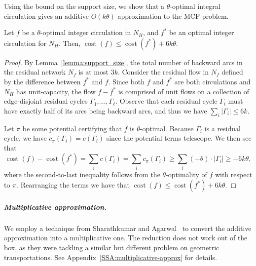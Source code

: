 \documentclass[a4paper,UKenglish]{socg-lipics-v2018}
\def\eps{\varepsilon}
\def\cost{\operatorname{cost}}
\theoremstyle{plain}
\numberwithin{figure}{section}
\renewcommand{\paragraph}{\subparagraph}
\begin{document}
Using the bound on the support size, we show that a $\theta$-optimal integral circulation gives an additive $O(k\theta)$-approximation to the MCF problem.

\begin{lemmarep}
\label{lemma:goldberg_cost_add}
Let $f$ be a $\theta$-optimal integer circulation in $N_H$, and $f^*$ be an optimal integer circulation for $N_H$.
Then, $\cost(f) \leq \cost(f^*) + 6k\theta$.
\end{lemmarep}

\begin{proof}
By Lemma~\ref{lemma:support_size}, the total number of backward arcs in the residual network $N_f$ is at most $3k$.
%
Consider the residual flow in $N_f$ defined by the difference between $f^*$ and $f$.
Since both $f$ and $f^*$ are both circulations and $N_H$ has unit-capacity,
the flow $f - f^*$ is comprised of unit flows on a collection of edge-disjoint residual cycles $\Gamma_1, \ldots, \Gamma_\ell$.
Observe that each residual cycle $\Gamma_i$ must have exactly half of its arcs being backward arcs, and thus we have $\sum_i |\Gamma_i| \leq 6k$.

Let $\pi$ be some potential certifying that $f$ is $\theta$-optimal.
Because $\Gamma_i$ is a residual cycle, we have $c_\pi(\Gamma_i) = c(\Gamma_i)$ since the potential terms telescope.
We then see that
\[
	\cost(f) - \cost(f^*)
	= \sum_i c(\Gamma_i)
	= \sum_i c_\pi(\Gamma_i)
	\geq \sum_i (-\theta) \cdot |\Gamma_i|
	\geq -6k\theta,
\]
where the second-to-last inequality follows from the $\theta$-optimality of $f$
with respect to $\pi$.
Rearranging the terms we have that $\cost(f) \leq \cost(f^*) + 6k\theta$.
\end{proof}


\paragraph{Multiplicative approximation.}
We employ a technique from Sharathkumar and Agarwal~\cite{SA12} to convert the
additive approximation into a multiplicative one.
The reduction does not work out of the box, as they were tackling a similar but
different problem on geometric transportations.
See Appendix~\ref{SSA:multiplicative-approx} for details.

\end{document}
